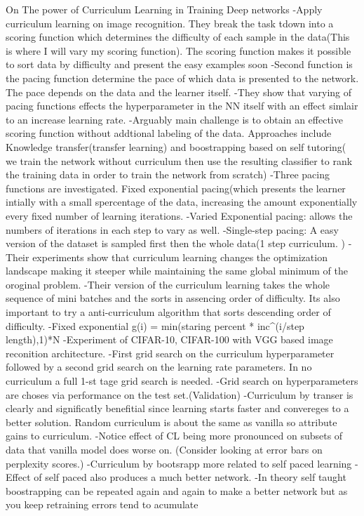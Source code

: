 On The power of Curriculum Learning in Training Deep networks
-Apply curriculum learning on image recognition. They break the task tdown into a scoring function which determines the difficulty of each sample in the data(This is where I will vary my scoring function). The scoring function makes it possible to sort data by difficulty and present the easy examples soon
-Second function is the pacing function determine the pace of which data is presented to the network. The pace depends on the data and the learner itself. 
-They show that varying of pacing functions effects the hyperparameter in the NN itself with an effect simlair to an increase learning rate. 
-Arguably main challenge is to obtain an effective scoring function without addtional labeling of the data. Approaches include Knowledge transfer(transfer learning) and boostrapping based on self tutoring( we train the network without curriculum then use the resulting classifier to rank the training data in order to train the network from scratch)
-Three pacing functions are investigated. Fixed exponential pacing(which presents the learner intially with a small spercentage of the data, increasing the amount exponentially every fixed number of learning iterations. 
-Varied Exponential pacing: allows  the numbers of iterations in each step to vary as well. 
-Single-step pacing:  A easy version of the dataset is sampled first then the whole data(1 step curriculum. )
-Their experiments show that curriculum learning changes the optimization landscape making it steeper while maintaining the same global minimum of the oroginal problem.
-Their version of the curriculum learning takes the whole sequence of mini batches and the sorts in assencing order of difficulty. Its also important to try a anti-curriculum algorithm that sorts descending order of difficulty. 
-Fixed exponential g(i) = min(staring percent * inc^(i/step length),1)*N
-Experiment of CIFAR-10, CIFAR-100 with VGG based image reconition architecture.
-First grid search on the curriculum hyperparameter followed by a second grid search on the learning rate parameters. In no curriculum a full 1-st tage grid search is needed. 
-Grid search on hyperparameters are choses via performance on the test set.(Validation)
-Curriculum by transer is clearly and significatly benefitial since learning starts faster and convereges to a better solution. Random curriculum is about the same as vanilla so attribute gains to curriculum. 
-Notice effect of CL being more pronounced on subsets of data that vanilla model does worse on. (Consider looking at error bars on perplexity scores.)
-Curriculum by bootsrapp more related to self paced learning
-Effect of self paced also produces a much better network. 
-In theory self taught boostrapping can be repeated again and again to make a better network but as you keep retraining errors tend to acumulate

